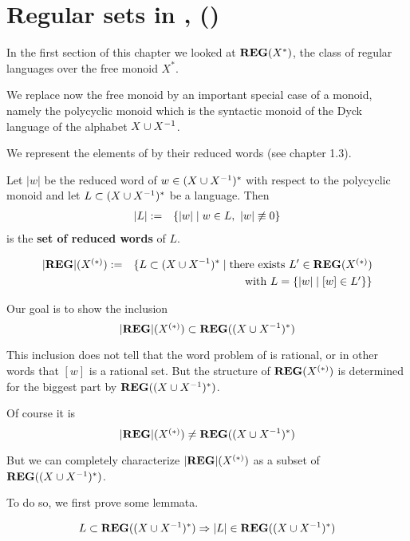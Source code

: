 \section{Regular sets in , \reglang()}

In the first section of this chapter we looked at $\mbox{{\bf REG}}(X^*)$, the class of
regular languages over the free monoid $X^*$.

We replace now the free monoid by an important special case of a monoid, namely
the polycyclic monoid  which is the syntactic monoid of the Dyck
language of the alphabet $X \cup {X}^{-1}$.

We represent the elements of  by their reduced words (see chapter
1.3).

\begin{definition}
Let $|w|$ be the reduced word of $w \in (X \cup {X}^{-1})^*$ with respect to the
polycyclic monoid  and let $L \subset (X \cup {X}^{-1})^*$ be a
language. Then
\begin{eqnarray*}
|L| &:=& \mbox{$\{|w| \mid w \in L,\ |w| \not\equiv 0\}$}
\end{eqnarray*}
is the {\bf set of reduced words} of $L$.
\end{definition}

\bigskip
\begin{definition}
\begin{eqnarray*}
|\mbox{{\bf REG}}|(\mbox{${X}^{(*)}$}) & := & \{ L \subset (X\cup X^{-1})^* \mid \mbox{there
exists }L' \in \mbox{{\bf REG}}(\mbox{${X}^{(*)}$}) \\
& & \mbox{ with } L = \mbox{$\{|w| \mid [w] \in L'\}$} \}
\end{eqnarray*}
\end{definition}

Our goal is to show the inclusion
\[ |\mbox{{\bf REG}}|(\mbox{${X}^{(*)}$}) \subset \mbox{{\bf REG}}((X \cup {X}^{-1})^*) \]

This inclusion does not tell that the word problem of  is rational,
or in other words that $[w]$ is a rational set. But the structure of
$\mbox{{\bf REG}}(\mbox{${X}^{(*)}$})$ is determined for the biggest part by $\mbox{{\bf REG}}(
(X \cup {X}^{-1})^*)$.

Of course it is
\[ |\mbox{{\bf REG}}|(\mbox{${X}^{(*)}$}) \neq \mbox{{\bf REG}}((X \cup {X}^{-1})^*) \]

But we can completely characterize $|\mbox{{\bf REG}}|(\mbox{${X}^{(*)}$})$ as a subset of $\mbox{{\bf REG}}((X
\cup X^{-1})^*)$.

To do so, we first prove some lemmata.

\begin{lemma}
\[ L \subset \mbox{{\bf REG}}((X \cup {X}^{-1})^*) \Rightarrow |L| \in \mbox{{\bf REG}}((X \cup {X}^{-1})^*)
\]
\end{lemma}

